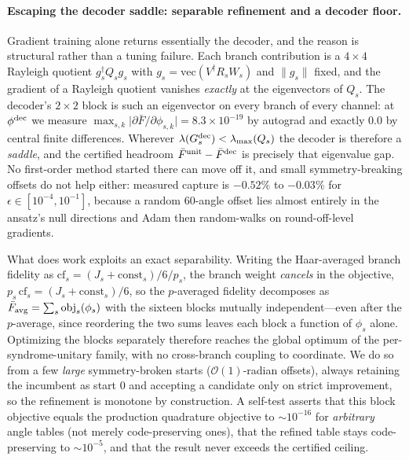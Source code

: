 \documentclass[aps,prxquantum,reprint,superscriptaddress]{revtex4-2}
\begin{document}
\paragraph{Escaping the decoder saddle: separable refinement and a decoder floor.}
Gradient training alone returns essentially the decoder, and the reason is
structural rather than a tuning failure. Each branch contribution is a $4\times4$
Rayleigh quotient $g_s^\dagger Q_s g_s$ with
$g_s=\mathrm{vec}(V^\dagger R_sW_s)$ and $\lVert g_s\rVert$ fixed, and the
gradient of a Rayleigh quotient vanishes \emph{exactly} at the eigenvectors of
$Q_s$. The decoder's $2\times2$ block is such an eigenvector on every branch of
every channel: at $\phi^{\rm dec}$ we measure
$\max_{s,k}\lvert\partial\bar F/\partial\phi_{s,k}\rvert=8.3\times10^{-19}$ by
autograd and exactly $0.0$ by central finite differences. Wherever
$\lambda(G^{\rm dec}_s)<\lambda_{\max}(Q_s)$ the decoder is therefore a
\emph{saddle}, and the certified headroom
$\bar F^{\rm unit}-\bar F^{\rm dec}$ is precisely that eigenvalue gap. No
first-order method started there can move off it, and small symmetry-breaking
offsets do not help either: measured capture is $-0.52\%$ to $-0.03\%$ for
$\epsilon\in[10^{-4},10^{-1}]$, because a random $60$-angle offset lies almost
entirely in the ansatz's null directions and Adam then random-walks on
round-off-level gradients.

What does work exploits an exact separability. Writing the Haar-averaged branch
fidelity as $\mathrm{cf}_s=(J_s+\mathrm{const}_s)/6/p_s$, the branch weight
\emph{cancels} in the objective, $p_s\,\mathrm{cf}_s=(J_s+\mathrm{const}_s)/6$,
so the $p$-averaged fidelity decomposes as
$\bar F_{\rm avg}=\sum_s \mathrm{obj}_s(\phi_s)$ with the sixteen blocks mutually
independent---even after the $p$-average, since reordering the two sums leaves
each block a function of $\phi_s$ alone. Optimizing the blocks separately
therefore reaches the global optimum of the per-syndrome-unitary family, with no
cross-branch coupling to coordinate. We do so from a few \emph{large}
symmetry-broken starts ($\mathcal{O}(1)$-radian offsets), always retaining the
incumbent as start $0$ and accepting a candidate only on strict improvement, so
the refinement is monotone by construction. A self-test asserts that this block
objective equals the production quadrature objective to $\sim10^{-16}$ for
\emph{arbitrary} angle tables (not merely code-preserving ones), that the refined
table stays code-preserving to $\sim10^{-5}$, and that the result never exceeds
the certified ceiling.
\end{document}
